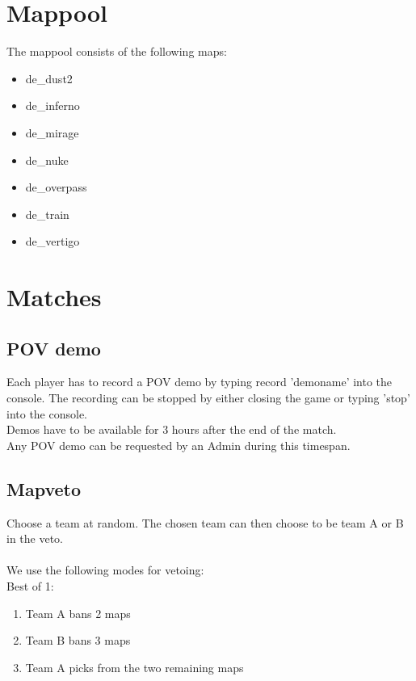 \documentclass{article}
\begin{document}
\section{Mappool}
The mappool consists of the following maps:
\begin{itemize}
    \item de\_dust2
    \item de\_inferno
    \item de\_mirage
    \item de\_nuke
    \item de\_overpass
    \item de\_train
    \item de\_vertigo
\end{itemize}

\pagebreak
\section{Matches}

\subsection{POV demo}
Each player has to record a POV demo by typing record 'demoname' into the console.
The recording can be stopped by either closing the game or typing 'stop' into the console.\\
Demos have to be available for 3 hours after the end of the match.\\
Any POV demo can be requested by an Admin during this timespan.

\subsection{Mapveto}
Choose a team at random. The chosen team can then choose to be team A or B in the veto.\\
\\
We use the following modes for vetoing:\\

Best of 1:
\begin{enumerate}
\item Team A bans 2 maps
\item Team B bans 3 maps
\item Team A picks from the two remaining maps
\end{enumerate}
\end{document}
